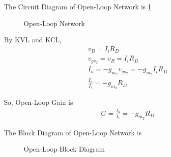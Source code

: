 \begin{enumerate}[label=\thesubsection.\arabic*.,ref=\thesubsection.\theenumi]
The Circuit Diagram of Open-Loop Network is \ref{fig:OpenLoop_Network}
\begin{figure}[ht!]
	\begin{center}
		\resizebox{\columnwidth}{!}{}
	\end{center}
	\caption{Open-Loop Network}
	\label{fig:OpenLoop_Network}
\end{figure}

By KVL and KCL,
\begin{align}
v_{B} = I_{i}R_{D}\\
v_{gs_{2}} = v_{B} = I_{i}R_{D}\\
I_{o} =  -g_{m_{2}}v_{gs_{2}} = -g_{m_{2}}I_{i}R_{D}\\
\frac{I_{o}}{I_{i}} = -g_{m_{2}}R_{D}
\end{align}

So, Open-Loop Gain is
\begin{align}
G = \frac{I_{o}}{I_{i}} =  -g_{m_{2}}R_{D}
\end{align}

The Block Diagram of Open-Loop Network is
\begin{figure}[ht!]
	\begin{center}
		\resizebox{\columnwidth/2}{!}{}
	\end{center}
	\caption{Open-Loop Block Diagram}
	\label{fig:OpenLoop_Block}
\end{figure}

\end{enumerate}
